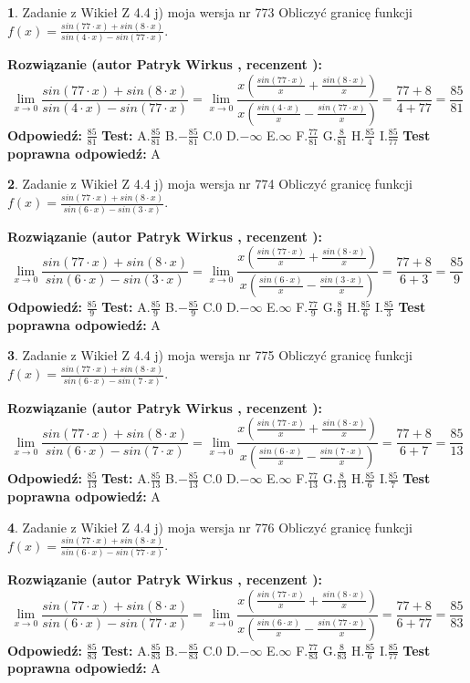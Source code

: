 \documentclass[12pt, a4paper]{article}
\theoremstyle{definition} %
\newtheorem{zad}{}
\newcommand{\zadStart}[1]{\begin{zad}#1\newline}
\newcommand{\zadStop}{\end{zad}}
\newcommand{\rozwStart}[2]{\noindent \textbf{Rozwiązanie (autor #1 , recenzent #2): }\newline}
\newcommand{\rozwStop}{\newline}
\newcommand{\odpStart}{\noindent \textbf{Odpowiedź:}\newline}
\newcommand{\odpStop}{\newline}
\newcommand{\testStart}{\noindent \textbf{Test:}\newline}
\newcommand{\testStop}{\newline}
\newcommand{\kluczStart}{\noindent \textbf{Test poprawna odpowiedź:}\newline}
\newcommand{\kluczStop}{\newline}
\begin{document}
\zadStart{Zadanie z Wikieł Z 4.4 j) moja wersja nr 773}
Obliczyć granicę funkcji $f(x)=\frac{sin(77\cdot x) +sin(8\cdot x)}{sin(4\cdot x) -sin(77\cdot x)}$.
\zadStop
\rozwStart{Patryk Wirkus}{}
$$\lim\limits_{x\to 0}\frac{sin(77\cdot x) +sin(8\cdot x)}{sin(4\cdot x) -sin(77\cdot x)}=\lim\limits_{x\to 0}\frac{x(\frac{sin(77\cdot x)}{x}+\frac{sin(8\cdot x)}{x})}{x(\frac{sin(4\cdot x)}{x}-\frac{sin(77\cdot x)}{x})}=\frac{77+8}{4+77} = \frac{85}{81}$$
\rozwStop
\odpStart
$\frac{85}{81}$
\odpStop
\testStart
A.$\frac{85}{81}$
B.$-\frac{85}{81}$
C.$0$
D.$-\infty$
E.$\infty$
F.$\frac{77}{81}$
G.$\frac{8}{81}$
H.$\frac{85}{4}$
I.$\frac{85}{77}$
\testStop
\kluczStart
A
\kluczStop



\zadStart{Zadanie z Wikieł Z 4.4 j) moja wersja nr 774}
Obliczyć granicę funkcji $f(x)=\frac{sin(77\cdot x) +sin(8\cdot x)}{sin(6\cdot x) -sin(3\cdot x)}$.
\zadStop
\rozwStart{Patryk Wirkus}{}
$$\lim\limits_{x\to 0}\frac{sin(77\cdot x) +sin(8\cdot x)}{sin(6\cdot x) -sin(3\cdot x)}=\lim\limits_{x\to 0}\frac{x(\frac{sin(77\cdot x)}{x}+\frac{sin(8\cdot x)}{x})}{x(\frac{sin(6\cdot x)}{x}-\frac{sin(3\cdot x)}{x})}=\frac{77+8}{6+3} = \frac{85}{9}$$
\rozwStop
\odpStart
$\frac{85}{9}$
\odpStop
\testStart
A.$\frac{85}{9}$
B.$-\frac{85}{9}$
C.$0$
D.$-\infty$
E.$\infty$
F.$\frac{77}{9}$
G.$\frac{8}{9}$
H.$\frac{85}{6}$
I.$\frac{85}{3}$
\testStop
\kluczStart
A
\kluczStop



\zadStart{Zadanie z Wikieł Z 4.4 j) moja wersja nr 775}
Obliczyć granicę funkcji $f(x)=\frac{sin(77\cdot x) +sin(8\cdot x)}{sin(6\cdot x) -sin(7\cdot x)}$.
\zadStop
\rozwStart{Patryk Wirkus}{}
$$\lim\limits_{x\to 0}\frac{sin(77\cdot x) +sin(8\cdot x)}{sin(6\cdot x) -sin(7\cdot x)}=\lim\limits_{x\to 0}\frac{x(\frac{sin(77\cdot x)}{x}+\frac{sin(8\cdot x)}{x})}{x(\frac{sin(6\cdot x)}{x}-\frac{sin(7\cdot x)}{x})}=\frac{77+8}{6+7} = \frac{85}{13}$$
\rozwStop
\odpStart
$\frac{85}{13}$
\odpStop
\testStart
A.$\frac{85}{13}$
B.$-\frac{85}{13}$
C.$0$
D.$-\infty$
E.$\infty$
F.$\frac{77}{13}$
G.$\frac{8}{13}$
H.$\frac{85}{6}$
I.$\frac{85}{7}$
\testStop
\kluczStart
A
\kluczStop



\zadStart{Zadanie z Wikieł Z 4.4 j) moja wersja nr 776}
Obliczyć granicę funkcji $f(x)=\frac{sin(77\cdot x) +sin(8\cdot x)}{sin(6\cdot x) -sin(77\cdot x)}$.
\zadStop
\rozwStart{Patryk Wirkus}{}
$$\lim\limits_{x\to 0}\frac{sin(77\cdot x) +sin(8\cdot x)}{sin(6\cdot x) -sin(77\cdot x)}=\lim\limits_{x\to 0}\frac{x(\frac{sin(77\cdot x)}{x}+\frac{sin(8\cdot x)}{x})}{x(\frac{sin(6\cdot x)}{x}-\frac{sin(77\cdot x)}{x})}=\frac{77+8}{6+77} = \frac{85}{83}$$
\rozwStop
\odpStart
$\frac{85}{83}$
\odpStop
\testStart
A.$\frac{85}{83}$
B.$-\frac{85}{83}$
C.$0$
D.$-\infty$
E.$\infty$
F.$\frac{77}{83}$
G.$\frac{8}{83}$
H.$\frac{85}{6}$
I.$\frac{85}{77}$
\testStop
\kluczStart
A
\kluczStop
\end{document}
